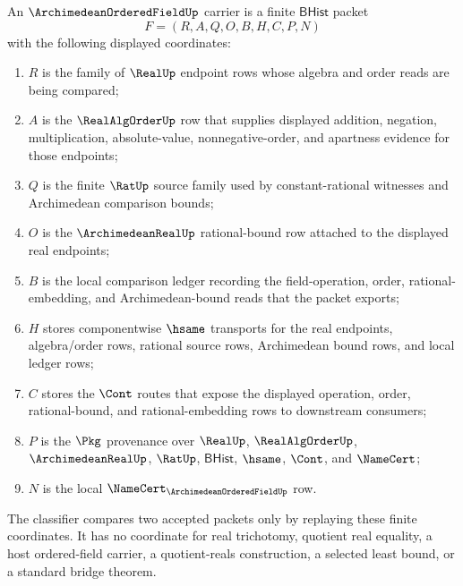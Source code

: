 \begin{definition}
\label{def:archimedean-ordered-field-carrier}
An $\ArchimedeanOrderedFieldUp$ carrier is a finite $\mathsf{BHist}$ packet
$$
F=(R,A,Q,O,B,H,C,P,N)
$$
with the following displayed coordinates:
\begin{enumerate}
\item $R$ is the family of $\RealUp$ endpoint rows whose algebra and order reads are being compared;
\item $A$ is the $\RealAlgOrderUp$ row that supplies displayed addition, negation, multiplication, absolute-value, nonnegative-order, and apartness evidence for those endpoints;
\item $Q$ is the finite $\RatUp$ source family used by constant-rational witnesses and Archimedean comparison bounds;
\item $O$ is the $\ArchimedeanRealUp$ rational-bound row attached to the displayed real endpoints;
\item $B$ is the local comparison ledger recording the field-operation, order, rational-embedding, and Archimedean-bound reads that the packet exports;
\item $H$ stores componentwise $\hsame$ transports for the real endpoints, algebra/order rows, rational source rows, Archimedean bound rows, and local ledger rows;
\item $C$ stores the $\Cont$ routes that expose the displayed operation, order, rational-bound, and rational-embedding rows to downstream consumers;
\item $P$ is the $\Pkg$ provenance over $\RealUp$, $\RealAlgOrderUp$, $\ArchimedeanRealUp$, $\RatUp$, $\mathsf{BHist}$, $\hsame$, $\Cont$, and $\NameCert$;
\item $N$ is the local $\NameCert_{\ArchimedeanOrderedFieldUp}$ row.
\end{enumerate}
The classifier compares two accepted packets only by replaying these finite coordinates. It has no coordinate for real trichotomy, quotient real equality, a host ordered-field carrier, a quotient-reals construction, a selected least bound, or a standard bridge theorem.
\end{definition}

